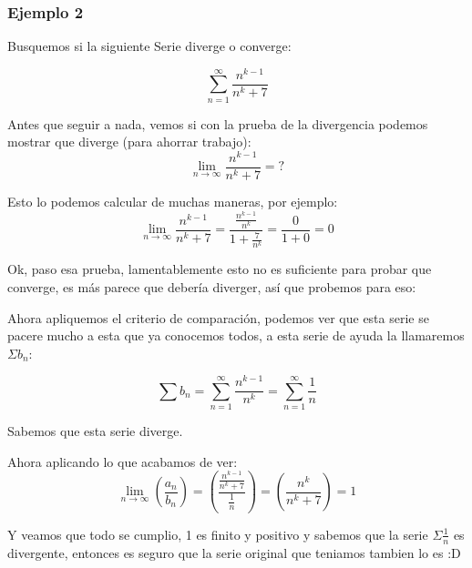 \documentclass[12pt]{report}                                %
\begin{document}
        \subsubsection{Ejemplo 2}
            Busquemos si la siguiente Serie diverge o converge:

            \begin{equation*}
                \sum_{n=1}^{\infty} \frac{n^{k-1}}{n^k+7}
            \end{equation*}
             
            Antes que seguir a nada, vemos si con la prueba de la divergencia podemos mostrar que diverge (para ahorrar trabajo):
            \begin{equation*}
                \lim_{n \to \infty} \frac{n^{k-1}}{n^k+7} = ?
            \end{equation*}

            Esto lo podemos calcular de muchas maneras, por ejemplo:
            \begin{equation*}
                \lim_{n \to \infty} \frac{n^{k-1}}{n^k+7} = \frac{ \frac{n^{k-1}}{n^k} }{1+\frac{7}{n^k}} = \frac{0}{1+0} = 0
            \end{equation*}

            Ok, paso esa prueba, lamentablemente esto no es suficiente para probar que converge, es más parece que debería diverger, así que probemos para eso:

            Ahora apliquemos el criterio de comparación, podemos ver que esta serie se pacere mucho a esta que ya conocemos todos, a esta serie de ayuda la llamaremos $\Sigma b_n$:

            \begin{equation*}
                \sum b_n = \sum_{n=1}^{\infty} \frac{n^{k-1}}{n^k} = \sum_{n=1}^{\infty} \frac{1}{n}
            \end{equation*}

            Sabemos que esta serie diverge.

            Ahora aplicando lo que acabamos de ver:
            \begin{equation*}
                \lim_{n \to \infty} \left( \frac{a_n}{b_n} \right) = \left( \frac{ \frac{n^{k-1}}{n^k+7} }{ \frac{1}{n} } \right) =  \left( \frac{n^k}{n^k+7} \right) = 1
            \end{equation*}

            Y veamos que todo se cumplio, 1 es finito y positivo y sabemos que la serie $\Sigma \frac{1}{n}$ es divergente, entonces es seguro que la serie original que teniamos tambien lo es :D
\end{document}
